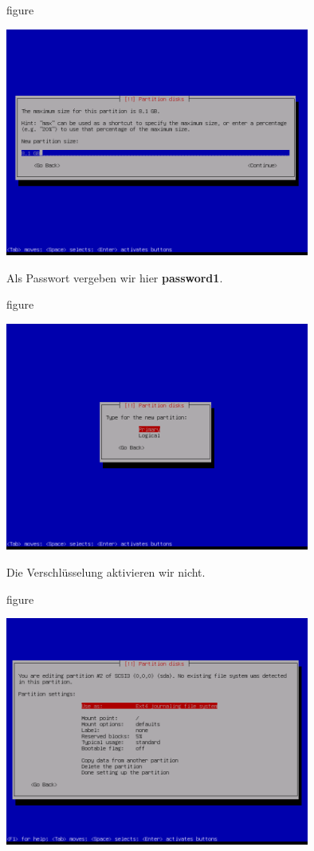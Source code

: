 \begin{nofloat}{figure}
\begin{center}
\includegraphics[width=0.75\textwidth]{screenshots/22_ubuntu_install.png}
\end{center}
\end{nofloat}

\pagebreak
Als Passwort vergeben wir hier \textbf{password1}.

\begin{nofloat}{figure}
\begin{center}
\includegraphics[width=0.75\textwidth]{screenshots/23_ubuntu_install.png}
\end{center}
\end{nofloat}

Die Verschlüsselung aktivieren wir nicht.

\begin{nofloat}{figure}
\begin{center}
\includegraphics[width=0.75\textwidth]{screenshots/24_ubuntu_install.png}
\end{center}
\end{nofloat}

